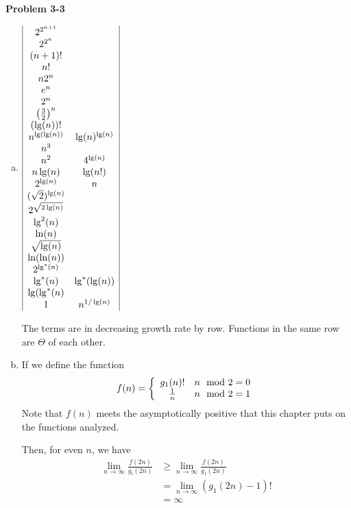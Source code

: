 \documentclass{article}
\begin{document}
\noindent\textbf{Problem 3-3}\\
\begin{enumerate}[a.]
\item
$
\begin{array}{|c c|}
2^{2^{n+1}}&\\
2^{2^n}&\\
(n+1)!&\\
n!&\\
n2^n&\\
e^n&\\
2^n&\\
\left(\frac{3}{2}\right)^n&\\
(\lg(n))!&\\
 n^{\lg(\lg(n))}&\lg(n)^{\lg(n)}\\
 n^3&\\
  n^2& 4^{\lg(n)}\\
  n\lg(n)&\lg(n!)\\
  2^{\lg(n)}&n\\
  (\sqrt{2})^{\lg(n)}&\\
  2^{\sqrt{2\lg(n)}}&\\
  \lg^2(n)&\\
  \ln(n)&\\
  \sqrt{\lg(n)}&\\
  \ln(\ln(n))&\\
  2^{\lg^*(n)}&\\
  \lg^*(n) &\lg^*(\lg(n))\\
  \lg(\lg^*(n)&\\
  1&n^{1/\lg(n)}

\end{array}
$


The terms are in decreasing growth rate by row. Functions in the same row are $\Theta$ of each other.
\item
If we define the function
\[
f(n) = \left\{\begin{array}{c c}g_1(n)!& n\mod 2=0 \\ \frac{1}{n} &n\mod 2 =1\end{array}\right.
\]
Note that $f(n)$ meets the asymptotically positive that this chapter puts on the functions analyzed.

Then, for even $n$, we have
\begin{align*}
\lim_{n\rightarrow\infty} \frac{f(2n)}{g_i(2n)} &\ge \lim_{n\rightarrow\infty} \frac{f(2n)}{g_1(2n)}\\
&= \lim_{n\rightarrow\infty} (g_1(2n) -1)!\\
&=\infty
\end{align*}


\end{enumerate}
\end{document}
